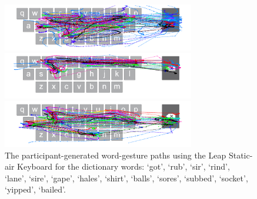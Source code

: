 \begin{figure}[t]
	\begin{minipage}[t]{8in}
	\hspace{-20pt}
	\begin{minipage}[t]{3.1in}
		\includegraphics[width=3.3in]{Figures/fig_socket_paths}
	\end{minipage}
	\begin{minipage}[t]{3in}
		\includegraphics[width=3.3in]{Figures/fig_yipped_paths}
	\end{minipage}
	\end{minipage}
	
	\begin{minipage}[t]{8in}
	\hspace{-20pt}
	\begin{minipage}[t]{3.1in}
		\includegraphics[width=3.3in]{Figures/fig_bailed_paths}
	\end{minipage}
	\end{minipage}
	\caption[User Generated Paths for the Leap Static-air Keyboard]{The participant-generated word-gesture paths using the Leap Static-air Keyboard for the dictionary words: `got', `rub', `sir', `rind', `lane', `sire', `gape', `hales', `shirt', `balls', `sores', `subbed', `socket', `yipped', `bailed'.}
\end{figure}

\clearpage

